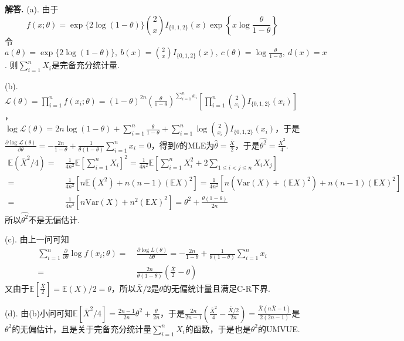 \documentclass[12pt, a4paper, oneside]{ctexart}
\newenvironment{solution}[1][]{\par\noindent\textbf{#1解答. }}{\smallskip\par}  %
\let\leq=\leqslant %
\def\E{\mathbb{E}}          %
\def\var{\text{Var}}        %
\def\L{\mathcal{L}}         %
\def\del{\vspace{-1.5ex}}   %
\begin{document}
\begin{solution}
    (a). 由于
    \begin{equation*}
        f(x;\theta) = \exp\{2\log(1-\theta)\}\binom{2}{x}I_{\{0,1,2\}}(x)\exp\left\{x\log\frac{\theta}{1-\theta}\right\}   
    \end{equation*}
    令$a(\theta) = \exp\{2\log(1-\theta)\},\ b(x) = \binom{2}{x}I_{\{0,1,2\}}(x),\ c(\theta) = \log\frac{\theta}{1-\theta},\ d(x) = x$. 则$\sum_{i=1}^nX_i$是完备充分统计量.

    (b). $\L(\theta) = \prod_{i=1}^nf(x_i;\theta) = (1-\theta)^{2n}\left(\frac{\theta}{1-\theta}\right)^{\sum_{i=1}^nx_i}\left[\prod_{i=1}^n\binom{2}{x_i}I_{\{0,1,2\}}(x_i)\right]$，\\
    $\log \L(\theta) = 2n\log(1-\theta) + \sum_{i=1}^n\frac{\theta}{1-\theta} + \sum_{i=1}^n\log\binom{2}{x_i}I_{\{0,1,2\}}(x_i)$，于是$\frac{\partial\log \L(\theta)}{\partial\theta} = -\frac{2n}{1-\theta}+\frac{1}{\theta(1-\theta)}\sum_{i=1}^nx_i = 0$，得到$\theta$的MLE为$\hat{\theta} = \frac{\bar{X}}{2}$，于是$\widehat{\theta^2} = \frac{\bar{X}^2}{4}$.\del
    \begin{align*}
        \E(\bar{X}^2/4) =&\ \frac{1}{4n^2}\E\left[\sum_{i=1}^nX_i\right]^2 = \frac{1}{4n^2}\E\left[\sum_{i=1}^nX_i^2+2\sum_{1\leq i<j\leq n}X_iX_j\right]\\
        =&\ \frac{1}{4n^2}\left[n\E(X^2)+n(n-1)(\E X)^2\right] = \frac{1}{4n^2}[n(\var(X)+(\E X)^2)+n(n-1)(\E X)^2]\\
        =&\ \frac{1}{4n^2}[n\var(X)+n^2(\E X)^2] = \theta^2+\frac{\theta(1-\theta)}{2n}
    \end{align*}
    所以$\widehat{\theta^2}$不是无偏估计.

    (c). 由上一问可知
    \begin{align*}
        \sum_{i=1}^n\frac{\partial}{\partial \theta}\log f(x_i;\theta) =&\ \frac{\partial \log L(\theta)}{\partial\theta} = -\frac{2n}{1-\theta}+\frac{1}{\theta(1-\theta)}\sum_{i=1}^nx_i\\
        =&\ \frac{2n}{\theta(1-\theta)}\left(\frac{\bar{X}}{2}-\theta\right)
    \end{align*}
    又由于$\E\left[\frac{\bar{X}}{2}\right] = \E(X)/2 = \theta$，所以$\bar{X}/2$是$\theta$的无偏统计量且满足C-R下界.

    (d). 由(b)小问可知$\E[\bar{X}^2/4] = \frac{2n-1}{2n}\theta^2+\frac{\theta}{2n}$，于是$\frac{2n}{2n-1}\left(\frac{\bar{X}^2}{4}-\frac{\bar{X}/2}{2n}\right) = \frac{\bar{X}(n\bar{X}-1)}{2(2n-1)}$是$\theta^2$的无偏估计，且是关于完备充分统计量$\sum_{i=1}^nX_i$的函数，于是也是$\theta^2$的UMVUE.


\end{solution}
\end{document}
